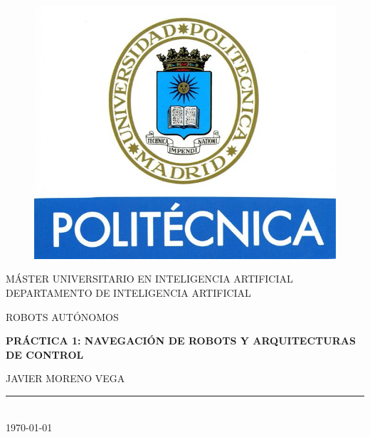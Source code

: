 \documentclass[14pt]{extarticle}
\theoremstyle{definition}
\theoremstyle{remark}
\begin{document}
\begin{titlepage}

\begin{center}
\vspace*{-1in}
\begin{figure}[htb]
\begin{center}
\includegraphics{upm.jpg}
\end{center}
\end{figure}
MÁSTER UNIVERSITARIO EN INTELIGENCIA ARTIFICIAL\\
\vspace*{0.15in}
DEPARTAMENTO DE INTELIGENCIA ARTIFICIAL \\
\vspace*{0.6in}
\begin{large}
ROBOTS AUTÓNOMOS\\
\end{large}
\vspace*{0.2in}
\begin{Large}
\textbf{PRÁCTICA 1: NAVEGACIÓN DE ROBOTS Y ARQUITECTURAS DE CONTROL} \\
\end{Large}
\vspace*{0.3in}
\begin{large}
JAVIER MORENO VEGA\\
\end{large}
\vspace*{0.3in}
\rule{80mm}{0.1mm}\\
\vspace*{0.1in}
\today
\end{center}
\end{titlepage}
\newpage
\tableofcontents %
\cleardoublepage
\end{document}
